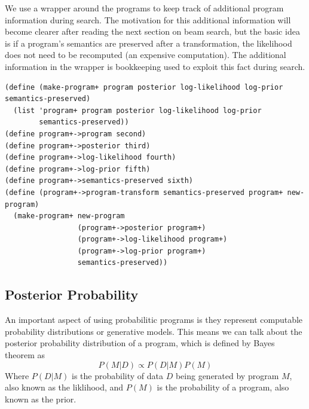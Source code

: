 \documentclass[a4paper,10pt]{article}
\begin{document}
We use a wrapper around the programs to keep track of additional program information during search.  The motivation for this additional information will become clearer after reading the next section on beam search, but the basic idea is if a program's semantics are preserved after a transformation, the likelihood does not need to be recomputed (an expensive computation). The additional information in the wrapper is bookkeeping used to exploit this fact during search.  
\begin{lstlisting}[frame=trBL]
(define (make-program+ program posterior log-likelihood log-prior semantics-preserved)
  (list 'program+ program posterior log-likelihood log-prior 
        semantics-preserved))
(define program+->program second)
(define program+->posterior third)
(define program+->log-likelihood fourth)
(define program+->log-prior fifth)
(define program+->semantics-preserved sixth)
(define (program+->program-transform semantics-preserved program+ new-program)
  (make-program+ new-program 
                 (program+->posterior program+) 
                 (program+->log-likelihood program+) 
                 (program+->log-prior program+) 
                 semantics-preserved))
\end{lstlisting}


\subsection{Posterior Probability}
An important aspect of using probabilitic programs is they represent computable probability distributions or generative models.  This means we can talk about the posterior probability distribution of a program, which is defined by Bayes theorem as 
\begin{equation}P(M|D)\propto P(D|M)P(M)\end{equation}
Where $P(D|M)$ is the probability of data $D$ being generated by program $M$, also known as the liklihood, and $P(M)$ is the probability of a program, also known as the prior.
\end{document}
